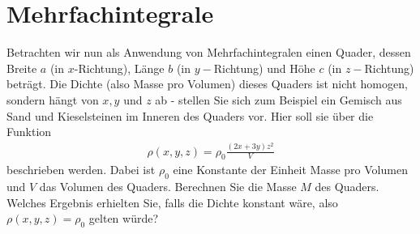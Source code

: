 \documentclass{scrartcl}
\begin{document}
\section{Mehrfachintegrale }
\label{sec:mehrfachintegrale2}

Betrachten wir nun als Anwendung von Mehrfachintegralen einen Quader, dessen Breite $a$ (in $x$-Richtung), Länge $b$ (in $y-$Richtung) und Höhe $c$ (in $z-$Richtung) beträgt. Die Dichte (also Masse pro Volumen) dieses Quaders ist nicht homogen, sondern hängt von $x,y$ und $z$ ab - stellen Sie sich zum Beispiel ein Gemisch aus Sand und Kieselsteinen im Inneren des Quaders vor. Hier soll sie über die Funktion
\begin{align*}
  \rho(x,y,z)=\rho_0\frac{(2x+3y)z^2}{V}
\end{align*}
beschrieben werden. Dabei ist $\rho_0$ eine Konstante der Einheit Masse pro Volumen und $V$ das Volumen des Quaders. Berechnen Sie die Masse $M$ des Quaders. Welches Ergebnis erhielten Sie, falls die Dichte konstant wäre, also $\rho(x,y,z)=\rho_0$ gelten würde?
\end{document}
